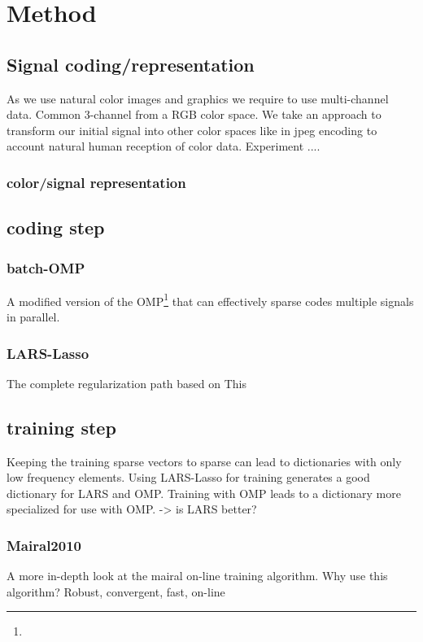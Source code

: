 \chapter{Method}


\section{Signal coding/representation}
As we use natural color images and graphics we require to use multi-channel data. Common 3-channel from a RGB color space.
We take an approach to transform our initial signal into other color spaces like in jpeg encoding to account natural human reception of
color data. 
Experiment ....
\subsection{color/signal representation}

\section{coding step}
\subsection{batch-OMP}
A modified version of the OMP\footnote{} that can effectively sparse codes multiple signals in parallel.

\subsection{LARS-Lasso}
The complete regularization path based on This \cite{lars.m}

\section{training step}
Keeping the training sparse vectors to sparse can lead to dictionaries with only low frequency elements.
Using LARS-Lasso for training generates a good dictionary for LARS and OMP. Training with OMP leads to 
a dictionary more specialized for use with OMP. -> is LARS better?

\subsection{Mairal2010}
A more in-depth look at the mairal on-line training algorithm. 
Why use this algorithm? Robust, convergent, fast, on-line

